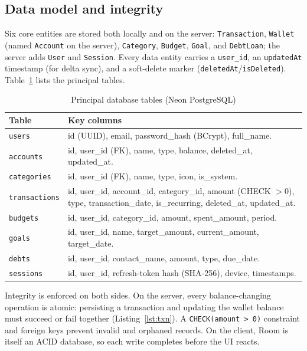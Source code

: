 \documentclass[13pt,a4paper]{extarticle}
\begin{document}
\subsection{Data model and integrity}
Six core entities are stored both locally and on the server: \texttt{Transaction}, \texttt{Wallet}
(named \texttt{Account} on the server), \texttt{Category}, \texttt{Budget}, \texttt{Goal}, and
\texttt{DebtLoan}; the server adds \texttt{User} and \texttt{Session}. Every data entity carries a
\texttt{user\_id}, an \texttt{updatedAt} timestamp (for delta sync), and a soft-delete marker
(\texttt{deletedAt}/\texttt{isDeleted}). Table~\ref{tab:schema} lists the principal tables.

\begin{table}[H]
\centering
\caption{Principal database tables (Neon PostgreSQL)}
\label{tab:schema}
\renewcommand{\arraystretch}{1.2}
\begin{tabularx}{\textwidth}{@{}l X@{}}
\toprule
\textbf{Table} & \textbf{Key columns} \\
\midrule
\texttt{users}        & id (UUID), email, password\_hash (BCrypt), full\_name. \\
\texttt{accounts}     & id, user\_id (FK), name, type, balance, deleted\_at, updated\_at. \\
\texttt{categories}   & id, user\_id (FK), name, type, icon, is\_system. \\
\texttt{transactions} & id, user\_id, account\_id, category\_id, amount (CHECK $>0$), type, transaction\_date, is\_recurring, deleted\_at, updated\_at. \\
\texttt{budgets}      & id, user\_id, category\_id, amount, spent\_amount, period. \\
\texttt{goals}        & id, user\_id, name, target\_amount, current\_amount, target\_date. \\
\texttt{debts}        & id, user\_id, contact\_name, amount, type, due\_date. \\
\texttt{sessions}     & id, user\_id, refresh-token hash (SHA-256), device, timestamps. \\
\bottomrule
\end{tabularx}
\end{table}

Integrity is enforced on both sides. On the server, every balance-changing operation is atomic:
persisting a transaction and updating the wallet balance must succeed or fail together
(Listing~\ref{lst:txn}). A \texttt{CHECK(amount > 0)} constraint and foreign keys prevent invalid
and orphaned records. On the client, Room is itself an ACID database, so each write completes before
the UI reacts.
\end{document}
